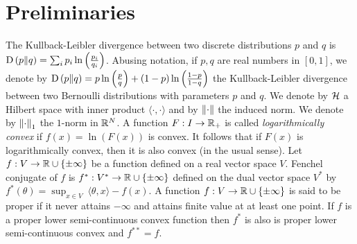 \section{Preliminaries}

The Kullback-Leibler divergence between two discrete
distributions $p$ and $q$ is $\operatorname*{D}\left({p}\middle\|{q}\right) = \sum_{i} p_i \ln\left( \tfrac{p_i}{q_i} \right)$. Abusing notation, if $p,q$ are real
numbers in $[0,1]$, we denote by
$\operatorname*{D}\left({p}\middle\|{q}\right) = p \ln \left(\tfrac{p}{q} \right) + (1-p) \ln \left(\tfrac{1-p}{1-q} \right)$
the Kullback-Leibler divergence between two Bernoulli distributions with parameters
$p$ and $q$.
We denote by $\mathcal{H}$ a Hilbert space with inner product $\langle \cdot, \cdot\rangle$ and by $\left\|{\cdot}\right\|$ the induced norm.
We denote by $\left\|{\cdot}\right\|_1$ the $1$-norm in $\mathbb{R}^N$.
A function $F:I \to \mathbb{R}_+$ is called \emph{logarithmically convex} if $f(x) = \ln(F(x))$ is convex. It follows that if
$F(x)$ is logarithmically convex, then it is also convex (in the usual sense).
Let $f:V \to \mathbb{R} \cup \{\pm\infty\}$ be a function defined on a real vector space
$V$. Fenchel conjugate of $f$ is $f^*:V^* \to \mathbb{R} \cup \{\pm \infty\}$
defined on the dual vector space $V^*$ by
$f^*(\theta) = \sup_{x \in V} \ \langle \theta, x \rangle - f(x)$.
A function $f:V \to \mathbb{R} \cup \{\pm \infty\}$ is said to be proper if it never
attains $-\infty$ and attains finite value at at least one point. If $f$ is a
proper lower semi-continuous convex function then $f^*$ is also is proper lower
semi-continuous convex and $f^{**}=f$.

